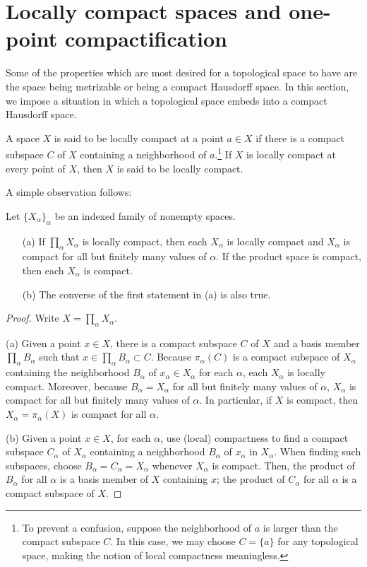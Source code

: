 \section{Locally compact spaces and one-point compactification}

Some of the properties which are most desired for a topological space to have are the space being metrizable or being a compact Hausdorff space.
In this section, we impose a situation in which a topological space embeds into a compact Hausdorff space.

\begin{defi}
    A space $X$ is said to be locally compact at a point $a\in X$ if there is a compact subspace $C$ of $X$ containing a neighborhood of $a$.\footnote{To prevent a confusion, suppose the neighborhood of $a$ is larger than the compact subspace $C$. In this case, we may choose $C=\{a\}$ for any topological space, making the notion of local compactness meaningless.}
    If $X$ is locally compact at every point of $X$, then $X$ is said to be locally compact.
\end{defi}

A simple observation follows:
\begin{obs}
    Let $\{X_\alpha\}_\alpha$ be an indexed family of nonempty spaces.
    \begin{enumerate}
        \item[(a)]
        {
            If $\prod_\alpha X_\alpha$ is locally compact, then each $X_\alpha$ is locally compact and $X_\alpha$ is compact for all but finitely many values of $\alpha$.
            If the product space is compact, then each $X_\alpha$ is compact.
        }
        \item[(b)]
        {
            The converse of the first statement in (a) is also true.
        }
    \end{enumerate}
\end{obs}
\begin{proof}
    Write $X=\prod_\alpha X_\alpha$.

    \hangindent=0.65cm
    \noindent(a)
    Given a point $x\in X$, there is a compact subspace $C$ of $X$ and a basis member $\prod_\alpha B_\alpha$ such that $x\in\prod_\alpha B_\alpha\subset C$.
    Because $\pi_\alpha(C)$ is a compact subspace of $X_\alpha$ containing the neighborhood $B_\alpha$ of $x_\alpha\in X_\alpha$ for each $\alpha$, each $X_\alpha$ is locally compact.
    Moreover, because $B_\alpha=X_\alpha$ for all but finitely many values of $\alpha$, $X_\alpha$ is compact for all but finitely many values of $\alpha$.
    In particular, if $X$ is compact, then $X_\alpha=\pi_\alpha(X)$ is compact for all $\alpha$.
    
    \noindent(b)
    Given a point $x\in X$, for each $\alpha$, use (local) compactness to find a compact subspace $C_\alpha$ of $X_\alpha$ containing a neighborhood $B_\alpha$ of $x_\alpha$ in $X_\alpha$.
    When finding such subspaces, choose $B_\alpha=C_\alpha=X_\alpha$ whenever $X_\alpha$ is compact.
    Then, the product of $B_\alpha$ for all $\alpha$ is a basis member of $X$ containing $x$; the product of $C_\alpha$ for all $\alpha$ is a compact subspace of $X$.
\end{proof}

